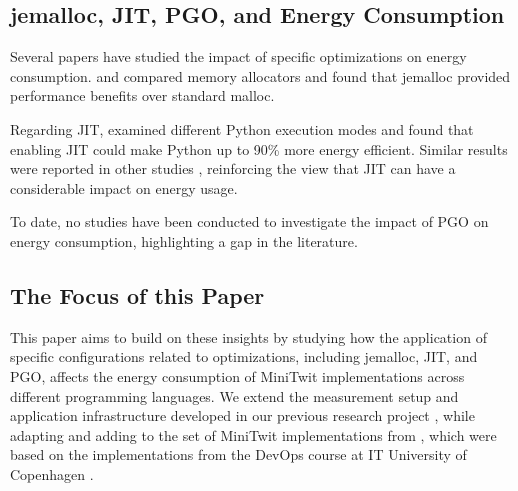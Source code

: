 \documentclass[main.tex]{subfiles}
\begin{document}
\subsection{jemalloc, JIT, PGO, and Energy Consumption}

Several papers have studied the impact of specific optimizations on energy consumption. \textcite{Li_Wu_Kavi_Mehta_Yadwadkar_John_2023} and \textcite{Lamprakos_Papadopoulos_Catthoor_Soudris_2022} compared memory allocators and found that jemalloc provided performance benefits over standard malloc.

Regarding JIT, \textcite{Stoico_Dragomir_Lago_2025} examined different Python execution modes and found that enabling JIT could make Python up to 90\% more energy efficient. Similar results were reported in other studies \cite{Ournani_Belgaid_Rouvoy_Rust_Penhoat_2021, Hu_John_2006}, reinforcing the view that JIT can have a considerable impact on energy usage.

To date, no studies have been conducted to investigate the impact of PGO on energy consumption, highlighting a gap in the literature.

\subsection{The Focus of this Paper}

This paper aims to build on these insights by studying how the application of specific configurations related to optimizations, including jemalloc, JIT, and PGO, affects the energy consumption of MiniTwit implementations across different programming languages. We extend the measurement setup and application infrastructure developed in our previous research project \cite{Pfeiffer_Offenberg_Pedersen_Landsgaard_Karlsen}, while adapting and adding to the set of MiniTwit implementations from \textcite{Pfeiffer_Trindade_Meding_Harwick}, which were based on the implementations from the DevOps course at IT University of Copenhagen \cite{devops-course}.
\end{document}
